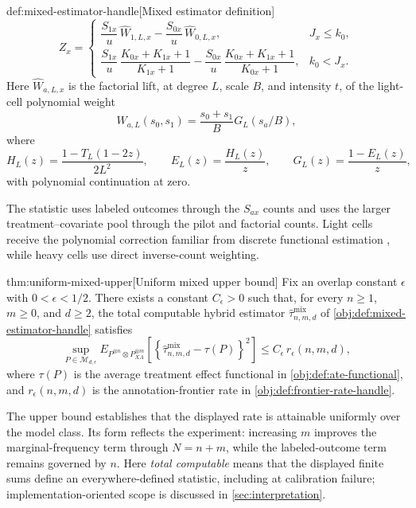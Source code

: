 \documentclass[11pt]{article}
\begin{document}
\begin{algorithmv}{def:mixed-estimator-handle}[Mixed estimator definition]
\[
Z_x
=
\begin{cases}
\dfrac{S_{1x}}u\,\widehat W_{1,L,x}
-
\dfrac{S_{0x}}u\,\widehat W_{0,L,x},
& J_x\le k_0,\\[1.2em]
\dfrac{S_{1x}}u\,\dfrac{K_{0x}+K_{1x}+1}{K_{1x}+1}
-
\dfrac{S_{0x}}u\,\dfrac{K_{0x}+K_{1x}+1}{K_{0x}+1},
& k_0<J_x.
\end{cases}
\]
Here \(\widehat W_{a,L,x}\) is the factorial lift, at degree \(L\), scale \(B\), and intensity \(t\), of the light-cell polynomial weight
\[
W_{a,L}(s_0,s_1)=\frac{s_0+s_1}{B}G_L(s_a/B),
\]
where
\[
H_L(z)=\frac{1-T_L(1-2z)}{2L^2},\qquad
E_L(z)=\frac{H_L(z)}z,\qquad
G_L(z)=\frac{1-E_L(z)}z,
\]
with polynomial continuation at zero.
\end{algorithmv}

The statistic  uses labeled outcomes through the \(S_{ax}\) counts and uses the larger treatment--covariate pool through the pilot and factorial counts. Light cells receive the polynomial correction familiar from discrete functional estimation \citep{JiaoVenkatHanWeissman2015,WuYang2016}, while heavy cells use direct inverse-count weighting.

\begin{theoremv}{thm:uniform-mixed-upper}[Uniform mixed upper bound]
Fix an overlap constant \(\epsilon\) with \(0<\epsilon<1/2\).  There exists a constant \(C_\epsilon>0\) such that, for every \(n\ge 1\), \(m\ge 0\), and \(d\ge 2\), the total computable hybrid estimator \(\widehat\tau^{\mathrm{mix}}_{n,m,d}\) of \cref{obj:def:mixed-estimator-handle} satisfies
\[
\sup_{P\in\mathcal M_{d,\epsilon}}
E_{P^{\otimes n}\otimes P_{XA}^{\otimes m}}
\!\left[
\left\{\widehat\tau^{\mathrm{mix}}_{n,m,d}-\tau(P)\right\}^2
\right]
\le
C_\epsilon\, r_\epsilon(n,m,d),
\]
where \(\tau(P)\) is the average treatment effect functional in \cref{obj:def:ate-functional}, and \(r_\epsilon(n,m,d)\) is the annotation-frontier rate in \cref{obj:def:frontier-rate-handle}.
\end{theoremv}

The upper bound establishes that the displayed rate is attainable uniformly over the model class. Its form reflects the experiment: increasing \(m\) improves the marginal-frequency term through \(N=n+m\), while the labeled-outcome term remains governed by \(n\). Here \emph{total computable} means that the displayed finite sums define an everywhere-defined statistic, including at calibration failure; implementation-oriented scope is discussed in \cref{sec:interpretation}.
\end{document}
